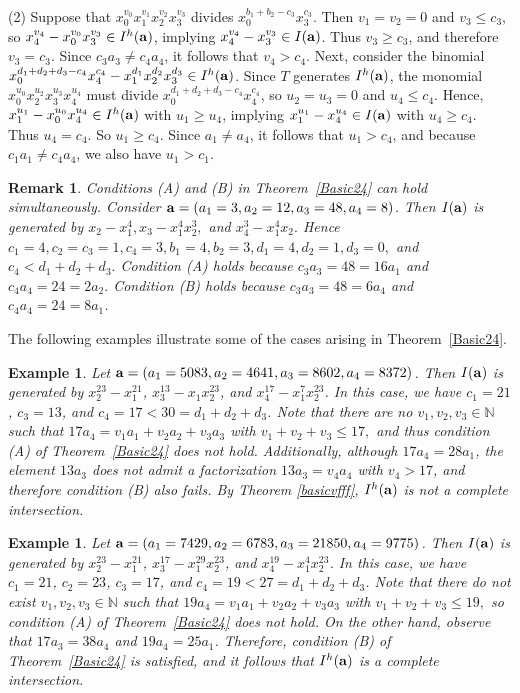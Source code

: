 \documentclass[10pt]{amsart}
\newtheorem{rem1}[thm1]{Remark}
\newtheorem{ex1}[thm1]{Example}
\begin{document}
(2) Suppose that $x_{0}^{v_0}x_{1}^{v_1}x_{2}^{v_2}x_{3}^{v_3}$ divides $x_{0}^{b_{1}+b_{2}-c_{3}}x_{3}^{c_3}$. Then $v_{1}=v_{2}=0$ and $v_{3} \leq c_{3}$, so $x_{4}^{v_4}-x_{0}^{v_0}x_{3}^{v_3} \in I^{h}({\bf a})$, implying $x_{4}^{v_4}-x_{3}^{v_3} \in I({\bf a})$. Thus $v_{3} \geq c_3$, and therefore $v_{3}=c_{3}$. Since $c_{3}a_{3} \neq c_4a_4$, it follows that $v_4>c_{4}$. Next, consider the binomial $x_{0}^{d_1+d_2+d_3-c_4}x_{4}^{c_4}-x_{1}^{d_1}x_2^{d_2}x_3^{d_3} \in I^{h}({\bf a})$. Since $T$ generates $I^{h}({\bf a})$, the monomial $x_{0}^{u_0}x_{2}^{u_2}x_{3}^{u_3}x_{4}^{u_4}$ must divide $x_{0}^{d_1+d_2+d_3-c_4}x_{4}^{c_4}$, so $u_2=u_3=0$ and $u_4 \leq c_4$. Hence, $x_{1}^{u_1}-x_{0}^{u_0}x_{4}^{u_4} \in I^{h}({\bf a})$ with $u_1 \geq u_4$, implying $x_{1}^{u_1}-x_{4}^{u_4} \in I({\bf a})$ with $u_4 \geq c_4$. Thus $u_4=c_4$. So $u_1 \geq c_4$. Since $a_1 \neq a_4$, it follows that $u_1>c_4$, and because $c_1a_1 \neq c_4a_4$, we also have $u_1>c_1$. \begin{rem1}\label{rem:Basic24}
{\rm Conditions {\rm (A)} and {\rm (B)} in Theorem~\ref{Basic24} can hold simultaneously. Consider
${\bf a}=(a_{1}=3, a_{2}=12, a_{3}=48, a_{4}=8)$. Then $
I({\bf a})$ is generated by $x_2-x_1^4, x_3-x_1^4x_2^3,$ and $x_4^3-x_1^4x_2.$ Hence
$ c_1=4, c_2=c_3=1, c_4=3, b_1=4,b_2=3, d_1=4, d_2=1, d_3=0,
$ and $c_4<d_1+d_2+d_3.$ Condition {\rm (A)} holds because
$c_3a_3=48=16a_1$ and $c_4a_4=24=2a_2.$ Condition {\rm (B)} holds because
$c_3a_3=48=6a_4$ and $c_4a_4=24=8a_1$.}
\end{rem1}

The following examples illustrate some of the cases arising in Theorem~\ref{Basic24}.

\begin{ex1} {\rm Let ${\bf a}=(a_{1}=5083,a_2=4641,a_3=8602,a_{4}=8372)$. Then $I({\bf a})$ is generated by $x_{2}^{23}-x_{1}^{21}$, $x_{3}^{13}-x_{1}x_{2}^{23}$, and $x_{4}^{17}-x_{1}^{7}x_{2}^{23}$. In this case, we have $c_1=21$, $c_3=13$, and $c_4=17<30=d_1+d_2+d_3$. Note that there are no $v_1, v_2, v_3 \in \mathbb{N}$ such that $17a_{4}=v_1a_{1}+v_{2}a_{2}+v_{3}a_{3}$ with $v_1+v_2+v_3 \leq 17,$ and thus condition (A) of Theorem~\ref{Basic24} does not hold. Additionally, although $17a_4=28a_1$, the element $13a_3$ does not admit a factorization $13a_3=v_4a_4$ with $v_4>17$, and therefore condition (B) also fails. By Theorem \ref{basicvfff}, $I^{h}({\bf a})$ is not a complete intersection.}
\end{ex1}

\begin{ex1} {\rm Let ${\bf a}=(a_{1}=7429,a_2=6783,a_3=21850,a_{4}=9775)$. Then $I({\bf a})$ is generated by $x_{2}^{23}-x_{1}^{21}$, $x_{3}^{17}-x_{1}^{29}x_{2}^{23}$, and $x_{4}^{19}-x_{1}^{4}x_{2}^{23}$. In this case, we have $c_1=21$, $c_2=23$, $c_3=17$, and $c_4=19<27=d_1+d_2+d_3$. Note that there do not exist $v_1, v_2, v_3 \in \mathbb{N}$ such that $19a_{4}=v_1a_{1}+v_{2}a_{2}+v_{3}a_{3}$ with $v_1+v_2+v_3 \leq 19,$ so condition (A) of Theorem~\ref{Basic24} does not hold. On the other hand, observe that $17a_3=38a_4$ and $19a_4=25a_1$. Therefore, condition (B) of Theorem~\ref{Basic24} is satisfied, and it follows that $I^{h}({\bf a})$ is a complete intersection.}
\end{ex1}
\end{document}
